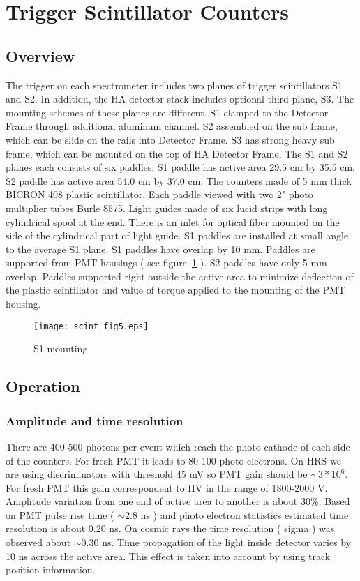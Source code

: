 \documentclass[12pt]{article}
\begin{document}
\section{Trigger Scintillator Counters}
\subsection{Overview}

The trigger on each spectrometer includes two planes of trigger scintillators S1 and S2.
In addition, the HA detector stack includes optional third plane, S3. The mounting schemes
of these planes are different. S1 clamped to the Detector Frame through additional 
aluminum channel. S2 assembled on the sub frame, which can be slide on the rails into Detector Frame.
S3 has strong heavy sub frame, which can be mounted on the top of HA Detector Frame.  
The S1 and S2 planes each consists of six paddles. S1 paddle has active area 29.5 cm by 35.5 cm.
S2 paddle has active area 54.0 cm by 37.0 cm. The counters made of 5 mm thick BICRON 
408 plastic scintillator. Each paddle viewed with two 2" photo multiplier tubes Burle 8575. 
Light guides made of six lucid strips with long cylindrical spool at the end. There is 
an inlet for optical fiber mounted on the side of the cylindrical part of light guide.
S1 paddles are installed at small angle to the average S1 plane. S1 paddles have overlap by 10 mm. 
Paddles are supported from PMT housings ( see figure~\ref{S1_mounting} ). 
S2 paddles have only 5 mm overlap. Paddles supported right 
outside the active area to minimize deflection of the plastic scintillator and value of 
torque applied to the mounting of the PMT housing.

\begin{figure}
\begin{center}
\texttt{[image: scint\_fig5.eps]}
{\linespread{1.}
\caption[S1 mounting scheme]{S1 mounting}
\label{S1_mounting}}
\end{center}
\end{figure}

\subsection{Operation}
\subsubsection{Amplitude and time resolution}

There are 400-500 photons per event which reach the photo cathode of each side of the counters.
For fresh PMT it leads to 80-100 photo electrons. On HRS we are using discriminators with 
threshold 45 mV so PMT gain should be $\sim 3*10^6$. For fresh PMT this gain correspondent to 
HV in the range of 1800-2000 V. 
Amplitude variation from one end of active area to another is about 30\%. 
Based on PMT pulse rise time ( $ \sim 2.8 $ ns ) and photo electron statistics estimated time resolution 
is about 0.20 ns. On cosmic rays the time resolution ( sigma ) was observed about $\sim 0.30$ ns.  
Time propagation of the light inside detector varies by 10 ns across the active area. This effect 
is taken into account by using track position information.
\end{document}
